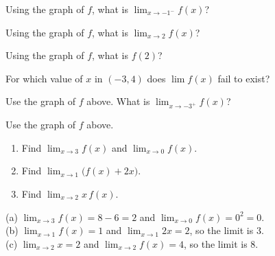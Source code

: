 \fgraph
\begin{exo}{}
Using the graph of $f$, what is $\displaystyle\lim_{x\to-1^-}f(x)$?
\end{exo}
\begin{exo}{}
Using the graph of $f$, what is $\displaystyle\lim_{x\to2}f(x)$?
\end{exo}
\begin{exo}{}
Using the graph of $f$, what is $f(2)$?
\end{exo}
\begin{exo}{}
For which value of $x$ in $(-3,4)$ does $\displaystyle\lim f(x)$ fail to exist?
\end{exo}
\begin{exo}[graph]{}
\begin{minipage}{\linewidth}
Use the graph of $f$ above. What is $\displaystyle\lim_{x\to-3^+}f(x)$?

\end{minipage}
\end{exo}
\begin{exo}{}
Use the graph of $f$ above.
\begin{enumerate}[label=(\alph*)]
\item Find $\displaystyle\lim_{x\to3}f(x)$ and $\displaystyle\lim_{x\to0}f(x)$.
\item Find $\displaystyle\lim_{x\to1}\big(f(x)+2x\big)$.
\item Find $\displaystyle\lim_{x\to2}x\,f(x)$.
\end{enumerate}
\begin{solution}
(a) $\lim_{x\to3}f(x)=8-6=2$ and $\lim_{x\to0}f(x)=0^2=0$.\\
(b) $\lim_{x\to1}f(x)=1$ and $\lim_{x\to1}2x=2$, so the limit is $3$.\\
(c) $\lim_{x\to2}x=2$ and $\lim_{x\to2}f(x)=4$, so the limit is $8$.
\end{solution}
\end{exo}

